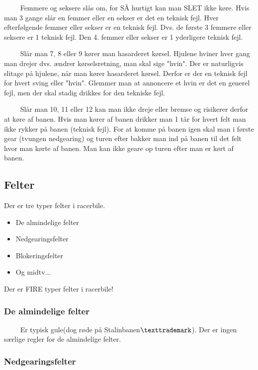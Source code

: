 \documentclass[12pt]{article}
\begin{document}
$\qquad$ Femmere og seksere slås om, for SÅ hurtigt kan man SLET ikke køre. Hvis man 3 gange slår en femmer eller en sekser er det en teknisk fejl. Hver efterfølgende femmer eller sekser er en teknisk fejl. Dvs. de første 3 femmere eller seksere er 1 teknisk fejl. Den 4. femmer eller sekser er 1 yderligere teknisk fejl.

$\qquad$ Slår man 7, 8 eller 9 kører man hasarderet kørsel. Hjulene hviner hver gang man drejer dvs. ændrer kørselsretning, man skal sige "hvin". Der er naturligvis slitage på hjulene, når man kører hasarderet kørsel. Derfor er der en teknisk fejl for hvert sving eller "hvin". Glemmer man at annoncere et hvin er det en generel fejl, men der skal stadig drikkes for den tekniske fejl.

$\qquad$  Slår man 10, 11 eller 12 kan man ikke dreje eller bremse og risikerer derfor at køre af banen. Hvis man kører af banen drikker man 1 tår for hvert felt man ikke rykker på banen (teknisk fejl). For at komme på banen igen skal man i første gear (tvungen nedgearing) og turen efter bakker man ind på banen til det felt hvor man kørte af banen. Man kan ikke geare op turen efter man er kørt af banen.


\subsection*{Felter}

Der er tre typer felter i racerbile.

\begin{itemize}
	\item De almindelige felter
	\item Nedgearingsfelter
	\item Blokeringsfelter
	\item Og midtv...
\end{itemize}

Der er FIRE typer felter i racerbile!


\subsubsection*{De almindelige felter}

$\qquad$ Er typisk gule(dog røde på Stalinbanen$\texttrademark$). Der er ingen særlige regler for de almindelige felter.


\subsubsection*{Nedgearingsfelter}
\end{document}
